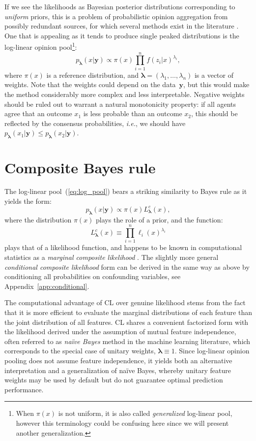\documentclass[english]{scrartcl}
\def\y{{\mathbf{y}}}
\newcommand{\blambda}{{\boldsymbol{\lambda}}}
\begin{document}
If we see the likelihoods as Bayesian posterior distributions corresponding to {\em uniform} priors, this is a problem of probabilistic opinion aggregation from possibly redundant sources, for which several methods exist in the literature \cite{Tarantola-82,Genest-86,Garg-04,Allard-12}. One that is appealing as it tends to produce single peaked distributions is the log-linear opinion pool\footnote{When $\pi(x)$ is not uniform, it is also called {\em generalized} log-linear pool, however this terminology could be confusing here since we will present another generalization.}:
\begin{equation}
\label{eq:log_pool}
p_\blambda(x|\y) \propto \pi(x) \prod_{i=1}^n f(z_i|x)^{\lambda_i},
\end{equation} 
where $\pi(x)$ is a reference distribution, and $\blambda=(\lambda_1,\ldots,\lambda_n)$ is a vector of weights. Note that the weights could depend on the data~$\y$, but this would make the method considerably more complex and less interpretable. Negative weights should be ruled out to warrant a natural monotonicity property: if all agents agree that an outcome $x_1$ is less probable than an outcome $x_2$, this should be reflected by the consensus probabilities, {\em i.e.}, we should have $p_\blambda(x_1|\y)\leq p_\blambda(x_2|\y)$. 


\section{Composite Bayes rule}
\label{sec:bayes_rule}

The log-linear pool~(\ref{eq:log_pool}) bears a striking similarity to Bayes rule as it yields the form: 
$$
p_\blambda(x|\y)\propto \pi(x) L^c_\blambda(x),
$$
where the distribution $\pi(x)$ plays the role of a prior, and the function:
\begin{equation}
\label{eq:comp_lik}
L^c_\blambda(x) \equiv \prod_{i=1}^n \ell_i (x)^{\lambda_i}
\end{equation} 
plays that of a likelihood function, and happens to be known in computational statistics as a {\em marginal composite likelihood} \cite{Varin-11}. The slightly more general {\em conditional composite likelihood} form can be derived in the same way as above by conditioning all probabilities on confounding variables, see Appendix~\ref{app:conditional}. 

The computational advantage of CL over genuine likelihood stems from the fact that it is more efficient to evaluate the marginal distributions of each feature than the joint distribution of all features. CL shares a convenient factorized form with the likelihood derived under the assumption of mutual feature independence, often referred to as {\em na\"ive Bayes} method in the machine learning literature, which corresponds to the special case of unitary weights, $\blambda\equiv 1$. Since log-linear opinion pooling does not assume feature independence, it yields both an alternative interpretation and a generalization of na\"ive Bayes, whereby unitary feature weights may be used by default but do not guarantee optimal prediction performance.
\end{document}
